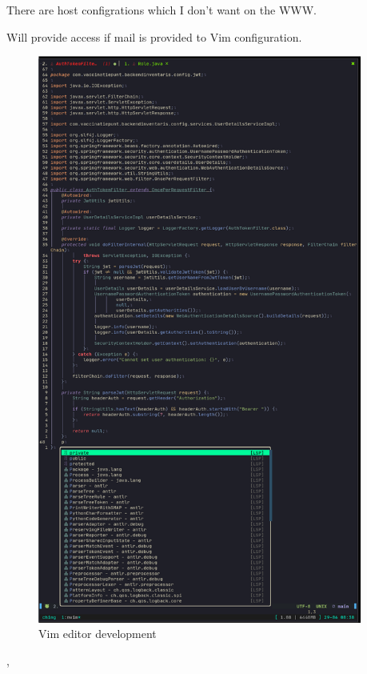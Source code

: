 {{{			There are host configrations which I don't want on the WWW.
		}
	}
	{%
		\label{bewijs:learn}
		Will provide access if mail is provided to Vim configuration.
		\begin{figure}
			\begin{center}
				\includegraphics[width=0.95\textwidth]{images/vim.png}
			\end{center}
			\caption{Vim editor development}
			\label{fig:vim}
		\end{figure}

	},
}
